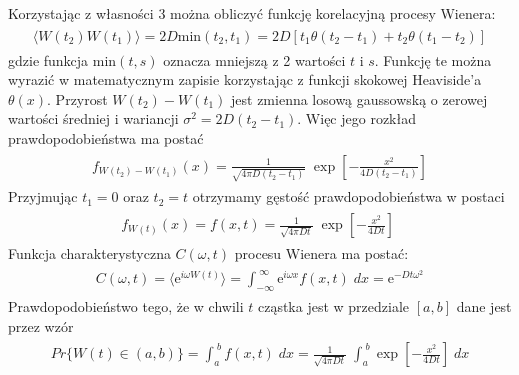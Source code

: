 \documentclass[a4paper,12pt,polish]{sphinxmanual}
\begin{document}
Korzystając z własności 3 można obliczyć funkcję korelacyjną procesy Wienera:
\label{ch3/chIII021:equation-eqn10}\begin{gather}
\begin{split}\langle W(t_2) W(t_1) \rangle = 2D \mbox{min} (t_2, t_1) = 2D [ t_1 \theta(t_2 - t_1) + t_2 \theta(t_1 -t_2)]\end{split}\label{ch3/chIII021-eqn10}
\end{gather}
gdzie funkcja $\mbox{min}(t,s)$ oznacza mniejszą z 2 wartości $t$ i $s$. Funkcję te można wyrazić w matematycznym zapisie korzystając z funkcji skokowej Heaviside'a $\theta(x)$. Przyrost $W(t_2) - W(t_1)$ jest zmienna losową gaussowską o zerowej wartości średniej i wariancji $\sigma^2 = 2D(t_2 - t_1)$. Więc jego rozkład prawdopodobieństwa ma postać
\label{ch3/chIII021:equation-eqn11}\begin{gather}
\begin{split}f_{W(t_2) - W(t_1)}(x) = \frac{1}{\sqrt{4\pi D (t_2 - t_1)} }\; \exp \left[ - \frac{x^2}{4D(t_2 - t_1)}\right]\end{split}\label{ch3/chIII021-eqn11}
\end{gather}
Przyjmując $t_1=0$ oraz $t_2=t$ otrzymamy gęstość prawdopodobieństwa w postaci
\label{ch3/chIII021:equation-eqn12}\begin{gather}
\begin{split}f_{W(t)}(x) = f(x, t) = \frac{1}{\sqrt{4\pi D t} }\; \exp \left[ - \frac{x^2}{4Dt}\right]\;\end{split}\label{ch3/chIII021-eqn12}
\end{gather}
Funkcja charakterystyczna $C(\omega, t)$ procesu Wienera ma postać:
\label{ch3/chIII021:equation-eqn13}\begin{gather}
\begin{split}C(\omega, t) = \langle \mbox{e}^{i\omega W(t)} \rangle = \int_{-\infty}^{\; \infty} \mbox{e}^{i\omega x} f(x, t)\; dx  = \mbox{e}^{-Dt \omega^2}\end{split}\label{ch3/chIII021-eqn13}
\end{gather}
Prawdopodobieństwo tego, że w chwili $t$ cząstka jest w przedziale $[a, b]$ dane jest przez wzór
\label{ch3/chIII021:equation-eqn14}\begin{gather}
\begin{split}Pr\{W(t) \in (a, b)\} = \int_a^{\; b} f(x, t) \; dx = \frac{1}{\sqrt{4\pi D t} }\; \int_a^{\; b} \exp \left[ - \frac{x^2}{4Dt}\right] \; dx\end{split}\label{ch3/chIII021-eqn14}
\end{gather}
\end{document}
